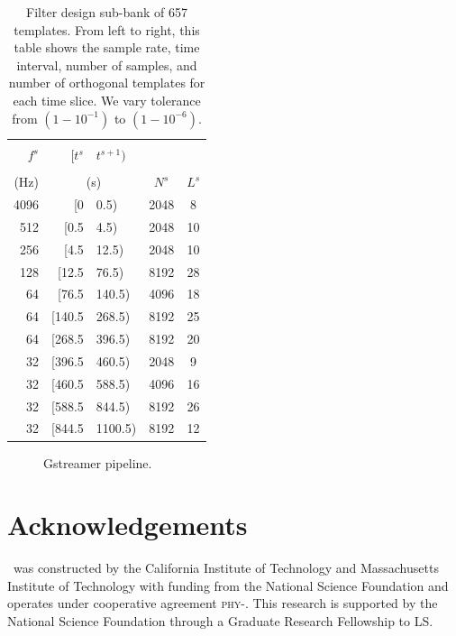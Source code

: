 \documentclass[portrait,plainboxedsections]{sciposter}
\begin{document}
\begin{minipage}[t]{0.25\textwidth}
\begin{table}
\begin{tabular}{rr@{,\,}lcc}
\toprule
\\ [-2ex]
$f^s$ & $[t^s$&$t^{s+1})$ & & \\%
\\[-2.5ex]
(Hz) & \multicolumn{2}{c}{(s)} & $N^s$ & $L^s$ \\ \midrule
4096 & [0&0.5) & 2048 & 8 \\
512 & [0.5&4.5) & 2048 & 10 \\
256 & [4.5&12.5) & 2048 & 10 \\
128 & [12.5&76.5) & 8192 & 28 \\
64 & [76.5&140.5) & 4096 & 18 \\
64 & [140.5&268.5) & 8192 & 25 \\
64 & [268.5&396.5) & 8192 & 20 \\
32 & [396.5&460.5) & 2048 & 9 \\
32 & [460.5&588.5) & 4096 & 16 \\
32 & [588.5&844.5) & 8192 & 26 \\
32 & [844.5&1100.5) & 8192 & 12 \\
\bottomrule
\end{tabular}
\caption{\label{tab:time_slices} Filter design sub-bank of 657 templates.  From left to right, this table shows the sample rate, time interval, number of samples, and number of orthogonal templates for each time slice.  We vary \SVD{} tolerance from $\left(1-10^{-1}\right)$ to $\left(1-10^{-6}\right)$.}
\end{table}


\begin{figure}
\centering
\caption{Gstreamer pipeline.}
\label{f:gstreamer_pipeline}
\end{figure}

\end{minipage}

\section*{Acknowledgements}

\LIGO\ was constructed by the California Institute of Technology and
Massachusetts Institute of Technology with funding from the National Science
Foundation and operates under cooperative agreement
\textsc{phy}-. This research
is supported by the National Science Foundation through a Graduate Research
Fellowship to LS.




\end{document}
